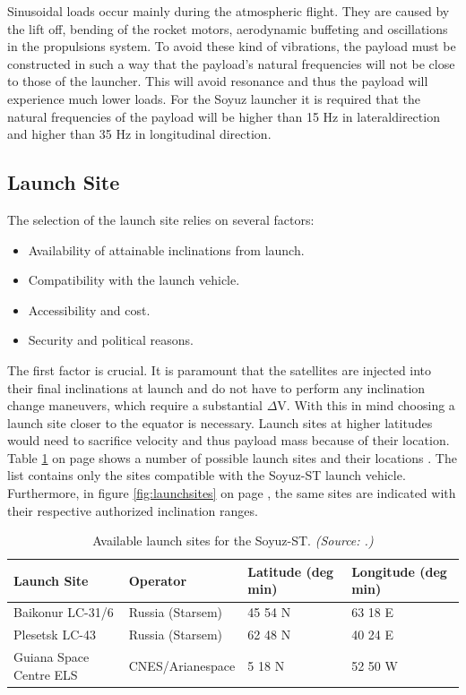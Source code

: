 Sinusoidal loads occur mainly during the atmospheric flight. They are caused by the lift off, bending of the rocket motors, aerodynamic buffeting and oscillations in the propulsions system. To avoid these kind of vibrations, the payload must be constructed in such a way that the payload's natural frequencies will not be close to those of the launcher. This will avoid resonance and thus the payload will experience much lower loads. For the Soyuz launcher it is required that the natural frequencies of the payload will be higher than 15 Hz in lateraldirection and higher than 35 Hz in longitudinal direction.  

\subsection{Launch Site}
\label{frLSLS}

The selection of the launch site relies on several factors:

\begin{itemize}
	\item Availability of attainable inclinations from launch.
	\item Compatibility with the launch vehicle.
	\item Accessibility and cost.
	\item Security and political reasons. 
\end{itemize}

The first factor is crucial. It is paramount that the satellites are injected into their final inclinations at launch and do not have to perform any inclination change maneuvers, which require a substantial $\Delta$V. With this in mind choosing a launch site closer to the equator is necessary. Launch sites at higher latitudes would need to sacrifice velocity and thus payload mass because of their location. Table \ref{table:launchtable} on page \pageref{table:launchtable} shows a number of possible launch sites and their locations \cite{larson}. The list contains only the sites compatible with the Soyuz-ST launch vehicle. Furthermore, in figure \ref{fig:launchsites} on page \pageref{fig:launchsites}, the same sites are indicated with their respective authorized inclination ranges.

\begin{table}[ht!]
\begin{centering}
\begin{tabular}{llp{2cm}p{2cm}}
\toprule
Launch Site & Operator & Latitude (deg min) & Longitude (deg min) \\
\hline \hline
Baikonur LC-31/6  & Russia (Starsem) & 45 54 N & 63 18 E \\
Plesetsk LC-43  & Russia (Starsem)   &  62 48 N & 40 24 E \\
Guiana Space Centre  ELS  & CNES/Arianespace  & 5 18 N & 52 50 W \\
\bottomrule
\end{tabular}
\caption{Available launch sites for the Soyuz-ST. \emph{(Source: \cite{larson}.)}}
\label{table:launchtable}
\end{centering}
\end{table}  

